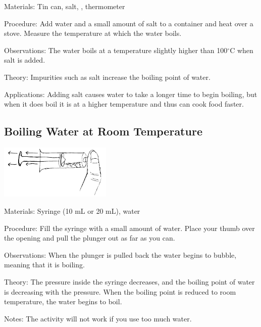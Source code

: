 \begin{multicols}{2}
\begin{description*}
\item[Materials:]{Tin can, salt, , thermometer}
\item[Procedure:]{Add water and a small amount of salt to a container and heat over a stove. Measure the temperature at which the water boils.}
\item[Observations:]{The water boils at a temperature slightly higher than 100$^\circ$C when salt is added.}
\item[Theory:]{Impurities such as salt increase the boiling point of water.}
\item[Applications:]{Adding salt causes water to take a longer time to begin boiling, but when it does boil it is at a higher temperature and thus can cook food faster.}
\end{description*}

\columnbreak

\subsection{Boiling Water at Room Temperature}

\begin{center}
\includegraphics[width=0.4\textwidth]{./img/boiling-room-temp.png}
\end{center}

\begin{description*}
\item[Materials:]{Syringe (10 mL or 20 mL), water}
\item[Procedure:]{Fill the syringe with a small amount of water. Place your thumb over the opening and pull the plunger out as far as you can.}
\item[Observations:]{When the plunger is pulled back the water begins to bubble, meaning that it is boiling.}
\item[Theory:]{The pressure inside the syringe decreases, and the boiling point of water is decreasing with the pressure. When the boiling point is reduced to room temperature, the water begins to boil.}
\item[Notes:]{The activity will not work if you use too much water.}
\end{description*}


\end{multicols}
